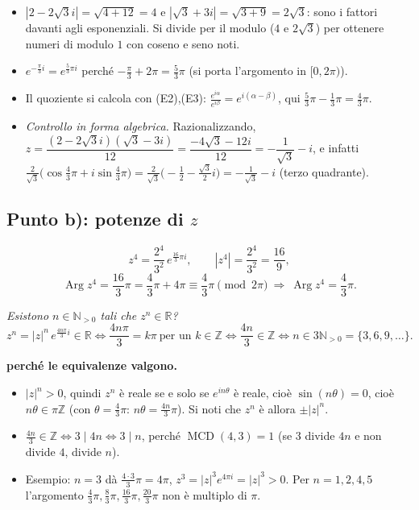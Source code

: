 \documentclass[11pt,a4paper]{article}
\newcommand{\RR}{\mathbb{R}}
\newcommand{\ZZ}{\mathbb{Z}}
\newcommand{\NN}{\mathbb{N}}
\newcommand{\Arg}{\operatorname{Arg}}
\newcommand{\MCD}{\operatorname{MCD}}
\theoremstyle{plain}
\theoremstyle{definition}
\theoremstyle{remark}
\begin{document}
\begin{itemize}[leftmargin=*]
  \item $|2-2\sqrt3i|=\sqrt{4+12}=4$ e $|\sqrt3+3i|=\sqrt{3+9}=2\sqrt3$: sono i fattori davanti agli esponenziali. Si divide per il modulo ($4$ e $2\sqrt3$) per ottenere numeri di modulo $1$ con coseno e seno noti.
  \item $e^{-\frac\pi3 i}=e^{\frac53\pi i}$ perché $-\frac\pi3+2\pi=\frac53\pi$ (si porta l'argomento in $[0,2\pi)$).
  \item Il quoziente si calcola con (E2),(E3): $\frac{e^{i\alpha}}{e^{i\beta}}=e^{i(\alpha-\beta)}$, qui $\frac53\pi-\frac13\pi=\frac43\pi$.
  \item \emph{Controllo in forma algebrica.} Razionalizzando,
  $z=\dfrac{(2-2\sqrt3i)(\sqrt3-3i)}{12}=\dfrac{-4\sqrt3-12i}{12}=-\dfrac1{\sqrt3}-i$,
  e infatti $\frac2{\sqrt3}\bigl(\cos\frac43\pi+i\sin\frac43\pi\bigr)=\frac2{\sqrt3}\bigl(-\frac12-\frac{\sqrt3}2i\bigr)=-\frac1{\sqrt3}-i$ (terzo quadrante).
\end{itemize}
\par\medskip

\subsection{Punto b): potenze di $z$}

\[
  z^4=\frac{2^4}{3^2}\,e^{\frac{16}3\pi i},\qquad |z^4|=\frac{2^4}{3^2}=\frac{16}{9},
\]
\[
  \Arg z^4=\frac{16}3\pi=\frac43\pi+4\pi\equiv\frac43\pi\pmod{2\pi}\ \Longrightarrow\ \Arg z^4=\frac43\pi.
\]

\medskip
\noindent\emph{Esistono $n\in\NN_{>0}$ tali che $z^n\in\RR$?}
\[
  z^n=|z|^n\,e^{\frac{4n\pi}3i}\in\RR
  \iff\frac{4n\pi}{3}=k\pi\ \text{per un }k\in\ZZ
  \iff\frac{4n}3\in\ZZ
  \iff n\in3\NN_{>0}=\{3,6,9,\dots\}.
\]

\par\medskip
\noindent\textbf{perché le equivalenze valgono.}\par

\begin{itemize}[leftmargin=*]
  \item $|z|^n>0$, quindi $z^n$ è reale se e solo se $e^{i n\theta}$ è reale, cioè $\sin(n\theta)=0$, cioè $n\theta\in\pi\ZZ$
  (con $\theta=\frac43\pi$: $n\theta=\frac{4n}3\pi$). Si noti che $z^n$ è allora $\pm|z|^n$.
  \item $\frac{4n}3\in\ZZ\iff3\mid4n\iff3\mid n$, perché $\MCD(4,3)=1$ (se $3$ divide $4n$ e non divide $4$, divide $n$).
  \item Esempio: $n=3$ dà $\frac{4\cdot3}3\pi=4\pi$, $z^3=|z|^3e^{4\pi i}=|z|^3>0$. Per $n=1,2,4,5$ l'argomento $\frac43\pi,\frac83\pi,\frac{16}3\pi,\frac{20}3\pi$ non è multiplo di $\pi$.
\end{itemize}
\par\medskip
\end{document}
